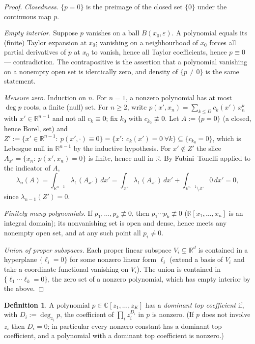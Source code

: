 \documentclass[11pt]{article}
\theoremstyle{definition}
\newtheorem{definition}[theorem]{Definition}
\theoremstyle{remark}
\theoremstyle{plain}
\newcommand{\R}{\mathbb{R}}
\newcommand{\C}{\mathbb{C}}
\begin{document}
\begin{proof}
\emph{Closedness.}  $\{p=0\}$ is the preimage of the closed set $\{0\}$ under the
continuous map $p$.

\emph{Empty interior.}  Suppose $p$ vanishes on a ball $B(x_0,\varepsilon)$.  A
polynomial equals its (finite) Taylor expansion at $x_0$; vanishing on a neighbourhood of
$x_0$ forces all partial derivatives of $p$ at $x_0$ to vanish, hence all Taylor
coefficients, hence $p\equiv0$ --- contradiction.  The contrapositive is the assertion
that a polynomial vanishing on a nonempty open set is identically zero, and density of
$\{p\neq0\}$ is the same statement.

\emph{Measure zero.}  Induction on $n$.  For $n=1$, a nonzero polynomial has at most
$\deg p$ roots, a finite (null) set.  For $n\ge2$, write
$p(x',x_n)=\sum_{k\le D}c_k(x')\,x_n^k$ with $x'\in\R^{n-1}$ and not all $c_k\equiv0$;
fix $k_0$ with $c_{k_0}\not\equiv0$.  Let $A:=\{p=0\}$ (a closed, hence Borel, set) and
$Z':=\{x'\in\R^{n-1}:\ p(x',\cdot)\equiv0\}=\{x':\ c_k(x')=0\ \forall k\}\subseteq
\{c_{k_0}=0\}$, which is Lebesgue null in $\R^{n-1}$ by the inductive hypothesis.  For
$x'\notin Z'$ the slice $A_{x'}=\{x_n:\ p(x',x_n)=0\}$ is finite, hence null in $\R$.  By
Fubini--Tonelli applied to the indicator of $A$,
\[
\lambda_n(A)=\int_{\R^{n-1}}\lambda_1(A_{x'})\,dx'
=\int_{Z'}\lambda_1(A_{x'})\,dx'+\int_{\R^{n-1}\setminus Z'}0\,dx'=0,
\]
since $\lambda_{n-1}(Z')=0$.

\emph{Finitely many polynomials.}  If $p_1,\dots,p_k\not\equiv0$, then
$p_1\cdots p_k\not\equiv0$ ($\R[x_1,\dots,x_n]$ is an integral domain); its nonvanishing
set is open and dense, hence meets any nonempty open set, and at any such point all
$p_i\neq0$.

\emph{Union of proper subspaces.}  Each proper linear subspace $V_i\subsetneq\R^d$ is
contained in a hyperplane $\{\ell_i=0\}$ for some nonzero linear form $\ell_i$ (extend a
basis of $V_i$ and take a coordinate functional vanishing on $V_i$).  The union is
contained in $\{\ell_1\cdots\ell_k=0\}$, the zero set of a nonzero polynomial, which has
empty interior by the above.
\end{proof}

\begin{definition}\label{def:dtc}
A polynomial $p\in\C[z_1,\dots,z_K]$ has a \emph{dominant top coefficient} if, with
$D_i:=\deg_{z_i}p$, the coefficient of $\prod_iz_i^{D_i}$ in $p$ is nonzero.  (If $p$ does
not involve $z_i$ then $D_i=0$; in particular every nonzero constant has a dominant top
coefficient, and a polynomial with a dominant top coefficient is nonzero.)
\end{definition}
\end{document}
